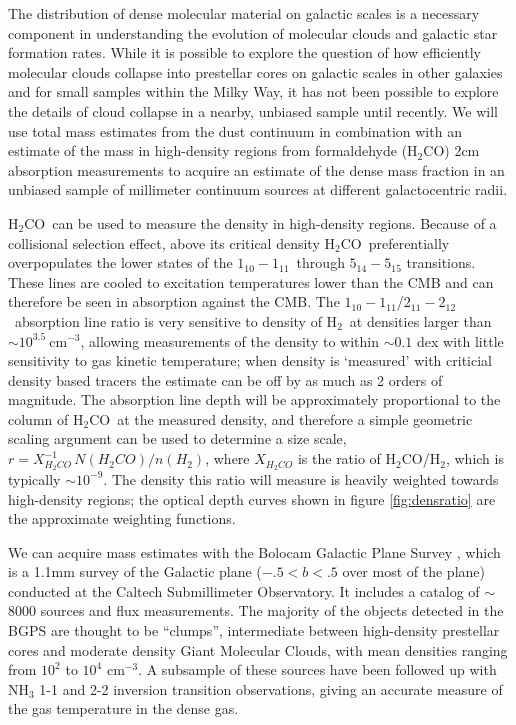\documentclass[11pt, preprint]{aastex}
\newcommand{\formaldehyde}{H\ensuremath{_2}CO}
\newcommand{\hh}{H\ensuremath{_2}}
\newcommand{\oneone}{\ensuremath{1_{10}-1_{11}}}
\newcommand{\twotwo}{\ensuremath{2_{11}-2_{12}}}
\newcommand{\percc}{\ensuremath{\textrm{cm}^{-3}}}
\newcommand{\percms}{\ensuremath{\textrm{cm}^{-3}}}
\begin{document}
\normalsize

The distribution of dense molecular material on galactic scales is a necessary
component in understanding the evolution of molecular clouds and galactic star
formation rates.  While it is possible to explore the question of how
efficiently molecular clouds collapse into prestellar cores on galactic scales
in other galaxies and for small samples within the Milky Way, it has not been
possible to explore the details of cloud collapse in a nearby, unbiased sample
until recently.  We will use total mass estimates from the dust continuum in
combination with an estimate of the mass in high-density regions from
formaldehyde (\formaldehyde) 2cm absorption measurements to acquire an estimate
of the dense mass fraction in an unbiased sample of millimeter continuum
sources at different galactocentric radii.  

\formaldehyde\ can be used to measure the density in high-density regions.
Because of a collisional selection effect, above its critical density
\formaldehyde\ preferentially overpopulates the lower states of the \oneone\
through $5_{14}-5_{15}$ transitions.  These lines are cooled to excitation
temperatures lower than the CMB and can therefore be seen in absorption against
the CMB.  The \oneone/\twotwo\ absorption line ratio is very sensitive to
density of \hh\ at densities larger than $\sim10^{3.5}\ \percc$, allowing
measurements of the density to within $\sim 0.1$ dex with little sensitivity to
gas kinetic temperature; when density is `measured' with criticial density
based tracers the estimate can be off by as much as 2 orders of magnitude.  The
absorption line depth will be approximately proportional to the column of
\formaldehyde\ at the measured density, and therefore a simple geometric
scaling argument can be used to determine a size scale, $r = X_{\formaldehyde\
}^{-1} N(\formaldehyde) / n(\hh)$, where $X_{\formaldehyde}$ is the ratio of
\formaldehyde/\hh, which is typically $\sim10^{-9}$.  The density this ratio
will measure is heavily weighted towards high-density regions; the optical
depth curves shown in figure \ref{fig:densratio} are the approximate weighting
functions.

We can acquire mass estimates with the Bolocam Galactic Plane Survey
\citep[BGPS,][]{aguirre2009}, which is a 1.1mm survey of the Galactic plane
($-.5<b<.5$ over most of the plane) conducted at the Caltech Submillimeter
Observatory.  It includes a catalog of $\sim$8000 sources and flux
measurements.  The majority of the objects detected in the BGPS are thought to
be ``clumps'', intermediate between high-density prestellar cores and moderate
density Giant Molecular Clouds, with mean densities ranging from $10^2$ to
$10^4$ \percc.  A subsample of these sources have been followed up with NH$_3$
1-1 and 2-2 inversion transition observations, giving an accurate measure of
the gas temperature in the dense gas.
\end{document}

